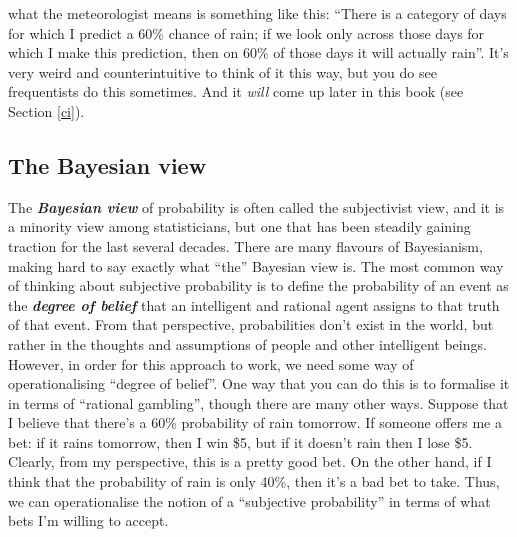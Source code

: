 \documentclass[
]{book}
\begin{document}
what the meteorologist means is something like this: ``There is a category of days for which I predict a 60\% chance of rain; if we look only across those days for which I make this prediction, then on 60\% of those days it will actually rain''. It's very weird and counterintuitive to think of it this way, but you do see frequentists do this sometimes. And it \emph{will} come up later in this book (see Section \ref{ci}).

\hypertarget{the-bayesian-view}{%
\subsection{The Bayesian view}\label{the-bayesian-view}}

The \textbf{\emph{Bayesian view}} of probability is often called the subjectivist view, and it is a minority view among statisticians, but one that has been steadily gaining traction for the last several decades. There are many flavours of Bayesianism, making hard to say exactly what ``the'' Bayesian view is. The most common way of thinking about subjective probability is to define the probability of an event as the \textbf{\emph{degree of belief}} that an intelligent and rational agent assigns to that truth of that event. From that perspective, probabilities don't exist in the world, but rather in the thoughts and assumptions of people and other intelligent beings.
However, in order for this approach to work, we need some way of operationalising ``degree of belief''. One way that you can do this is to formalise it in terms of ``rational gambling'', though there are many other ways. Suppose that I believe that there's a 60\% probability of rain tomorrow. If someone offers me a bet: if it rains tomorrow, then I win \$5, but if it doesn't rain then I lose \$5. Clearly, from my perspective, this is a pretty good bet. On the other hand, if I think that the probability of rain is only 40\%, then it's a bad bet to take. Thus, we can operationalise the notion of a ``subjective probability'' in terms of what bets I'm willing to accept.
\end{document}
